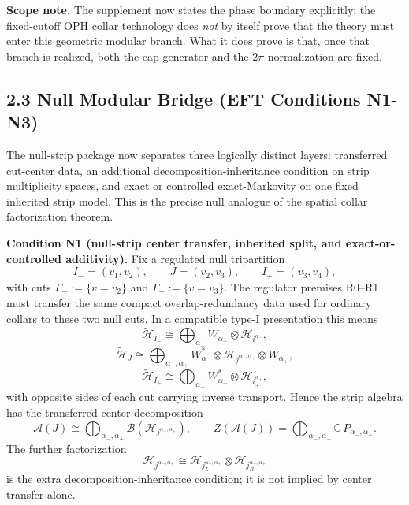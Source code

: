 \textbf{Scope note.} The supplement now states the phase boundary explicitly: the fixed-cutoff OPH collar technology does \emph{not} by itself prove that the theory must enter this geometric modular branch. What it does prove is that, once that branch is realized, both the cap generator and the \(2\pi\) normalization are fixed.

\subsection{2.3 Null Modular Bridge (EFT Conditions N1-N3)}\label{23-null-modular-bridge-eft-conditions-n1-n3}

The null-strip package now separates three logically distinct layers: transferred cut-center data, an additional decomposition-inheritance condition on strip multiplicity spaces, and exact or controlled exact-Markovity on one fixed inherited strip model. This is the precise null analogue of the spatial collar factorization theorem.

\textbf{Condition N1 (null-strip center transfer, inherited split, and exact-or-controlled additivity).} Fix a regulated null tripartition
\[
I_-=(v_1,v_2),\qquad
J=(v_2,v_3),\qquad
I_+=(v_3,v_4),
\]
with cuts \(\Gamma_-:=\{v=v_2\}\) and \(\Gamma_+:=\{v=v_3\}\). The regulator premises R0--R1 must transfer the same compact overlap-redundancy data used for ordinary collars to these two null cuts. In a compatible type-I presentation this means
\[
\tilde{\mathcal H}_{I_-}
\cong
\bigoplus_{\alpha_-}
W_{\alpha_-}\otimes \mathcal H_{i_-^{\alpha_-}},
\]
\[
\tilde{\mathcal H}_{J}
\cong
\bigoplus_{\alpha_-,\alpha_+}
W_{\alpha_-}^{*}\otimes
\mathcal H_{j^{\alpha_-,\alpha_+}}\otimes
W_{\alpha_+},
\]
\[
\tilde{\mathcal H}_{I_+}
\cong
\bigoplus_{\alpha_+}
W_{\alpha_+}^{*}\otimes \mathcal H_{i_+^{\alpha_+}},
\]
with opposite sides of each cut carrying inverse transport. Hence the strip algebra has the transferred center decomposition
\[
\mathcal A(J)
\cong
\bigoplus_{\alpha_-,\alpha_+}
\mathcal B(\mathcal H_{j^{\alpha_-,\alpha_+}}),
\qquad
Z(\mathcal A(J))
=
\bigoplus_{\alpha_-,\alpha_+}\mathbb C\,P_{\alpha_-,\alpha_+}.
\]
The further factorization
\[
\mathcal H_{j^{\alpha_-,\alpha_+}}
\cong
\mathcal H_{j_L^{\alpha_-,\alpha_+}}
\otimes
\mathcal H_{j_R^{\alpha_-,\alpha_+}}
\]
is the extra decomposition-inheritance condition; it is not implied by center transfer alone.

